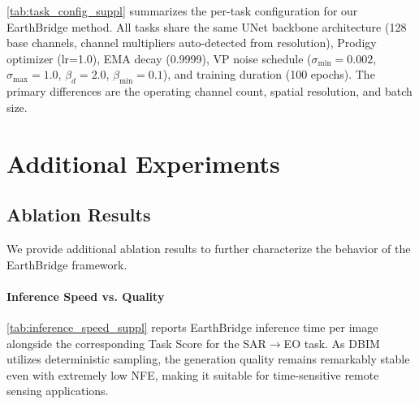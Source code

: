 {\color{gray}
\cref{tab:task_config_suppl} summarizes the per-task configuration for our EarthBridge method. All tasks share the same UNet backbone architecture (128 base channels, channel multipliers auto-detected from resolution), Prodigy optimizer (lr=1.0), EMA decay (0.9999), VP noise schedule ($\sigma_{\min}=0.002$, $\sigma_{\max}=1.0$, $\beta_d=2.0$, $\beta_{\min}=0.1$), and training duration (100 epochs). The primary differences are the operating channel count, spatial resolution, and batch size.
}

\section{Additional Experiments}
\label{sec:suppl_experiments}

\subsection{Ablation Results}
\label{sec:suppl_ablation}

{\color{gray}
We provide additional ablation results to further characterize the behavior of the EarthBridge framework.
}

\paragraph{Inference Speed vs. Quality}
{\color{gray}
\cref{tab:inference_speed_suppl} reports EarthBridge inference time per image alongside the corresponding Task Score for the SAR$\rightarrow$EO task. As DBIM utilizes deterministic sampling, the generation quality remains remarkably stable even with extremely low NFE, making it suitable for time-sensitive remote sensing applications.
}

\begin{table}[h]
\centering
\caption{{\color{gray}EarthBridge inference speed and quality trade-off (SAR$\rightarrow$EO).}}
\label{tab:inference_speed_suppl}
{\color{gray}
}
\end{table}

